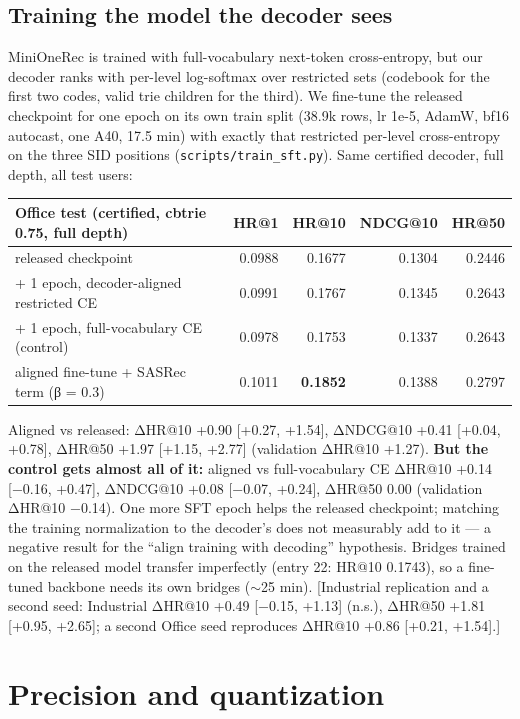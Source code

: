 \documentclass[11pt]{article}
\newcommand{\code}[1]{\texttt{#1}}
\begin{document}
\subsection{Training the model the decoder sees}\label{sec:6.y}

MiniOneRec is trained with full-vocabulary next-token cross-entropy, but our decoder ranks with per-level log-softmax over restricted sets (codebook for the first two codes, valid trie children for the third). We fine-tune the released checkpoint for one epoch on its own train split (38.9k rows, lr 1e-5, AdamW, bf16 autocast, one A40, 17.5 min) with exactly that restricted per-level cross-entropy on the three SID positions (\code{scripts/\allowbreak{}train\_\allowbreak{}sft.py}). Same certified decoder, full depth, all test users:

{\small
\setlength{\tabcolsep}{4pt}
\begin{longtable}{lrrrr}
\toprule
Office test (certified, cbtrie 0.75, full depth) & HR@1 & HR@10 & NDCG@10 & HR@50 \\
\midrule
\endhead
released checkpoint & 0.0988 & 0.1677 & 0.1304 & 0.2446 \\
+ 1 epoch, decoder-aligned restricted CE & 0.0991 & 0.1767 & 0.1345 & 0.2643 \\
+ 1 epoch, full-vocabulary CE (control) & 0.0978 & 0.1753 & 0.1337 & 0.2643 \\
aligned fine-tune + SASRec term (β = 0.3) & 0.1011 & \textbf{0.1852} & 0.1388 & 0.2797 \\
\bottomrule
\end{longtable}
}

Aligned vs released: ΔHR@10 +0.90 [+0.27, +1.54], ΔNDCG@10 +0.41 [+0.04, +0.78], ΔHR@50 +1.97 [+1.15, +2.77] (validation ΔHR@10 +1.27). \textbf{But the control gets almost all of it:} aligned vs full-vocabulary CE ΔHR@10 +0.14 [−0.16, +0.47], ΔNDCG@10 +0.08 [−0.07, +0.24], ΔHR@50 0.00 (validation ΔHR@10 −0.14). One more SFT epoch helps the released checkpoint; matching the training normalization to the decoder's does not measurably add to it — a negative result for the ``align training with decoding'' hypothesis. Bridges trained on the released model transfer imperfectly (entry 22: HR@10 0.1743), so a fine-tuned backbone needs its own bridges (\ensuremath{\sim}25 min). [Industrial replication and a second seed: Industrial ΔHR@10 +0.49 [−0.15, +1.13] (n.s.), ΔHR@50 +1.81 [+0.95, +2.65]; a second Office seed reproduces ΔHR@10 +0.86 [+0.21, +1.54].]

\section{Precision and quantization}\label{sec:7}
\end{document}

